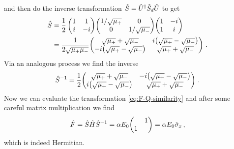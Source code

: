         and then do the inverse transformation $\hat{S} = \hat{U}^\dag \hat{S}_d \hat{U}$ to get
        \begin{align*}
            \hS 
            &= \frac{1}{2}\pmqty{1 & 1 \\ i & -i} \!\pmqty{\dmat[0]{1/\sqrt{\mu_{+}}, 1/\sqrt{\mu_{-}}}} \!\pmqty{1 & -i \\ 1 & i} \\
            &= \frac{1}{2\sqrt{\mu_{+}\mu_{-}}} \!\pmqty{\admat[\sqrt{\mu_{+}} + \sqrt{\mu_{-}}]{i\pqty{\sqrt{\mu_{+}} - \sqrt{\mu_{-}}} , -i\pqty{\sqrt{\mu_{+}} - \sqrt{\mu_{-}}}}}
            \myperiod
        \end{align*}
        Via an analogous process we find the inverse
        \begin{align*}
            \hS^{-1} = \frac{1}{2} \!\pmqty{\admat[\sqrt{\mu_{+}} + \sqrt{\mu_{-}}]{-i\pqty{\sqrt{\mu_{+}} - \sqrt{\mu_{-}}} , i\pqty{\sqrt{\mu_{+}} - \sqrt{\mu_{-}}}}}
            \myperiod
        \end{align*}
        Now we can evaluate the transformation \eqref{eq:F-Q-similarity} and after some careful matrix multiplication we find 
        \begin{equation*}
            \hF = \hS \hH \hS^{-1}
            = \alpha E_0 \!\pmqty{\admat{1,1}}
            = \alpha E_0 \togglehat{\sigma}_x
            \mycomma
        \end{equation*}
        which is indeed Hermitian.
        
